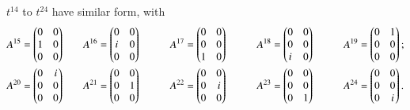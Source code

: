 $t^{14}$ to $t^{24}$ have similar form, with
\begin{align}
      & A^{15} = \begin{pmatrix} 0 & 0 \\ 1 & 0 \\ 0 & 0 \end{pmatrix}  \quad
      && A^{16} = \begin{pmatrix} 0 & 0 \\ i & 0 \\ 0 & 0 \end{pmatrix}  \quad
      &&& A^{17} = \begin{pmatrix} 0 & 0 \\ 0 & 0 \\ 1 & 0 \end{pmatrix}  \quad
      &&&& A^{18} = \begin{pmatrix} 0 & 0 \\ 0 & 0 \\ i & 0 \end{pmatrix}  \quad
      &&&&& A^{19} = \begin{pmatrix} 0 & 1 \\ 0 & 0 \\ 0 & 0 \end{pmatrix};  \notag \\
      & A^{20} = \begin{pmatrix} 0 & i \\ 0 & 0 \\ 0 & 0 \end{pmatrix}  \quad
      && A^{21} = \begin{pmatrix} 0 & 0 \\ 0 & 1 \\ 0 & 0 \end{pmatrix}  \quad
      &&& A^{22} = \begin{pmatrix} 0 & 0 \\ 0 & i \\ 0 & 0 \end{pmatrix}  \quad
      &&&& A^{23} = \begin{pmatrix} 0 & 0 \\ 0 & 0 \\ 0 & 1 \end{pmatrix}  \quad
      &&&&& A^{24} = \begin{pmatrix} 0 & 0 \\ 0 & 0 \\ 0 & i \end{pmatrix}.  \label{2.12}
\end{align}

